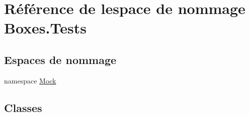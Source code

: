 \hypertarget{namespace_boxes_1_1_tests}{}\section{Référence de l\textquotesingle{}espace de nommage Boxes.\+Tests}
\label{namespace_boxes_1_1_tests}
\subsection*{Espaces de nommage}
\begin{DoxyCompactItemize}
\item 
namespace \hyperlink{namespace_boxes_1_1_tests_1_1_mock}{Mock}
\end{DoxyCompactItemize}
\subsection*{Classes}
